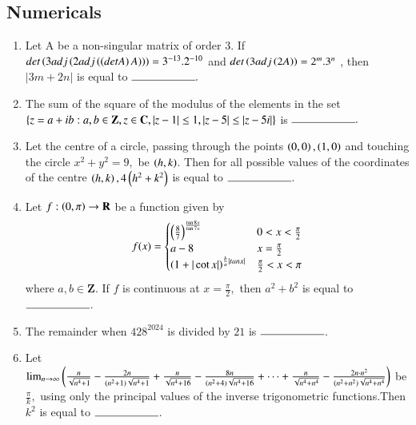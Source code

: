 \documentclass[journal,12pt,onecolumn]{IEEEtran}
\theoremstyle{remark}
\begin{document}
\subsection{Numericals}
\begin{enumerate}
   \item Let A be a non-singular matrix of order $3$. If $det\left(3adj\left(2adj\left(\left(det A\right)A\right)\right)\right) = 3^{-13} . 2^{-10}$ and $det\left(3adj\left(2A\right)\right)= 2^m.3^n$ , then $|3m + 2n|$ is equal to $ \rule{2cm}{0.15mm}.$ \\

   \item  The sum of the square of the modulus of the elements in the set $ \{ z=a+ib : a,b \in \textbf{Z},z \in \textbf{C},|z-1| \le 1,\\ |z-5| \le |z-5i| \}$  is $ \rule{2cm}{0.15mm}.$ \\

   \item Let the centre of a circle, passing through the points $\left(0,0\right), \left(1,0\right)$ and touching the circle $x^{2} + y^{2} = 9,$ be $\left(h,k\right)$. Then for all possible values of the coordinates of the centre $\left(h,k\right) , 4\left(h^{2} + k^{2}\right) $ is equal to $\rule{2cm}{0.15mm}$.\\

   \item Let $f:\left(0,\pi\right) \rightarrow\textbf{R}$ be a function given by 
   \begin{align*}
   f(x) =
    \begin{cases} 
     \left(\frac{8}{7}\right) ^ \frac{\tan 8x}{\tan 7x} & 0 <x<\frac{\pi}{2} \\
      a-8 & x = \frac{\pi}{2}\\
      \left(1+|\cot x|\right) ^ {\frac{b}{a} |tanx|} & \frac{\pi}{2} < x <\pi
        \end{cases}
  \end{align*}
  where $a,b \in \textbf{Z}.$ If $f$ is continuous at $x = \frac{\pi}{2},$ then $a^2 + b^2$ is equal to $\rule{2cm}{0.15mm}$.\\

  \item The remainder when $428 ^{2024}$ is divided by $21$ is $\rule{2cm}{0.15mm}$.\\

  \item Let $\lim_{n\rightarrow\infty}\left(\frac{n}{\sqrt{n^{4}+1}}-\frac{2n}{(n^{2}+1)\sqrt{n^{4}+1}}+\frac{n}{\sqrt{n^{4}+16}}-\frac{8n}{(n^{2}+4)\sqrt{n^{4}+16}} +\cdots+\frac{n}{\sqrt{n^{4}+n^{4}}}-\frac{2n\cdot n^{2}}{(n^{2}+n^{2})\sqrt{n^{4}+n^{4}}}\right)$ be $\frac{\pi}{k},$ using only the principal values of the inverse trigonometric functions.Then $k^2$ is equal to $\rule{2cm}{0.15mm}$.\\
  

\end{enumerate}
\end{document}
